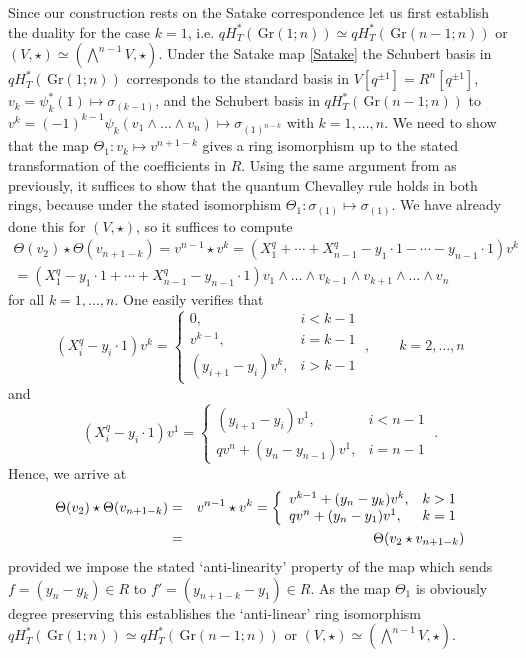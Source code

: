 \documentclass[12pt]{amsart}
\newcommand{\Gr}{\,\mathrm{Gr}}
\newcommand{\ring}{R}
\numberwithin{equation}{section}
\numberwithin{figure}{section}
\begin{document}
    Since our construction rests on the Satake correspondence let us first establish the duality for the case $k=1$, i.e. $qH^*_T(\Gr(1;n))\simeq qH^*_T(\Gr(n-1;n))$ or $(V,\star)\simeq(\bigwedge^{n-1}V,\star)$. Under the Satake map \eqref{Satake} the Schubert basis in $qH^*_T(\Gr(1;n))$ corresponds to the standard basis in $V[q^{\pm1}]=\ring^n[q^{\pm 1}]$, $v_k=\psi^*_k(1)\mapsto\sigma_{(k-1)}$, and the Schubert basis in $qH^*_T(\Gr(n-1;n))$ to $v^k=(-1)^{k-1}\psi_k(v_1\wedge\ldots\wedge v_n)\mapsto \sigma_{(1)^{n-k}}$ with $k=1,\ldots,n$. We need to show that the map $\Theta_1:v_k\mapsto v^{n+1-k}$ gives a ring isomorphism up to the stated transformation of the coefficients in $\ring$. Using the same argument from \cite[Cor. 7.1]{MihalceaAIM} as previously, it suffices to show that the quantum Chevalley rule holds in both rings, because under the stated isomorphism $\Theta_1:\sigma_{(1)}\mapsto\sigma_{(1)}$. We have already done this for $(V,\star)$, so it suffices to compute
    \begin{multline*}
        \Theta(v_2)\star\Theta(v_{n+1-k})=v^{n-1}\star v^{k}=
    (X^q_1+\cdots+X^q_{n-1}-y_1\cdot1-\cdots-y_{n-1}\cdot1)v^{k}\\
    =(X^q_1-y_1\cdot 1+\cdots+X^q_{n-1}-y_{n-1}\cdot1)v_1\wedge\ldots\wedge v_{k-1}\wedge v_{k+1}\wedge\ldots\wedge v_n
    \end{multline*}
    for all $k=1,\ldots,n$. One easily verifies that
    \[
    (X^q_i-y_i\cdot1)v^k=\left\{
    \begin{array}{ll}
         0,&i<k-1  \\
         v^{k-1},& i=k-1\\
         (y_{i+1}-y_i)v^k,&i>k-1
    \end{array}
    \right.\;,\qquad k=2,\ldots,n
    \]
    and
    \[
    (X^q_{i}-y_{i}\cdot1)v^1=\left\{
    \begin{array}{ll}
         (y_{i+1}-y_i)v^1,&i<n-1  \\
         qv^{n}+(y_n-y_{n-1})v^1,& i=n-1
    \end{array}
    \right.\;.
    \]
    Hence, we arrive at
    \begin{eqnarray}\label{LR1}
    \Theta(v_2)\star\Theta(v_{n+1-k})&=&v^{n-1}\star v^{k}=\left\{
    \begin{array}{ll}
         v^{k-1}+(y_{n}-y_k)v^k,&k>1  \\
         qv^{n}+(y_n-y_{1})v^1,& k=1
    \end{array}
    \right.\\
    &=&\Theta(v_2\star v_{n+1-k})\notag
    \end{eqnarray}
    provided we impose the stated `anti-linearity' property of the map which sends $f=(y_n-y_k)\in\ring$ to $f'=(y_{n+1-k}-y_1)\in\ring$. As the map $\Theta_1$ is obviously degree preserving this establishes the `anti-linear' ring isomorphism $qH^*_T(\Gr(1;n))\simeq qH^*_T(\Gr(n-1;n))$ or $(V,\star)\simeq(\bigwedge^{n-1}V,\star)$.
\end{document}
